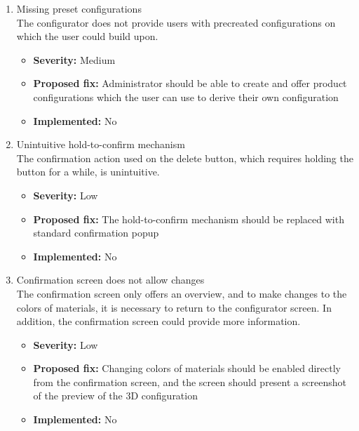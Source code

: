 \begin{enumerate}[label=\textbf{I\arabic*:}, leftmargin=*]
    \item Missing preset configurations
        \vspace{2pt}
        \\The configurator does not provide users with precreated configurations on which the user could build upon.
        \begin{itemize}[noitemsep, label=\trianglebullet]
            \item \textbf{Severity:} Medium
            \item \textbf{Proposed fix:} Administrator should be able to create and offer product configurations which the user can use to derive their own configuration
            \item \textbf{Implemented:} No
        \end{itemize}
        \vspace{4pt}

    \item Unintuitive hold-to-confirm mechanism
        \vspace{2pt}
        \\The confirmation action used on the delete button, which requires holding the button for a while, is unintuitive.
        \begin{itemize}[noitemsep, label=\trianglebullet]
            \item \textbf{Severity:} Low
            \item \textbf{Proposed fix:} The hold-to-confirm mechanism should be replaced with standard confirmation popup
            \item \textbf{Implemented:} No
        \end{itemize}
        \vspace{4pt}

    \item Confirmation screen does not allow changes
        \vspace{2pt}
        \\The confirmation screen only offers an overview, and to make changes to the colors of materials, it is necessary to return to the configurator screen. In addition, the confirmation screen could provide more information.
        \begin{itemize}[noitemsep, label=\trianglebullet]
            \item \textbf{Severity:} Low
            \item \textbf{Proposed fix:} Changing colors of materials should be enabled directly from the confirmation screen, and the screen should present a screenshot of the preview of the 3D configuration
            \item \textbf{Implemented:} No
        \end{itemize}
        \vspace{4pt}


\end{enumerate}
